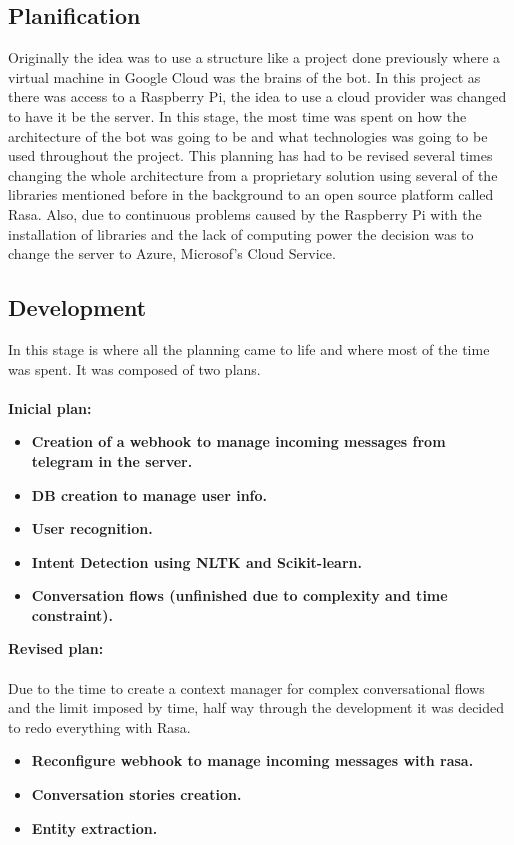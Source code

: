 \subsection{Planification}\label{sec:chap1_plan}
Originally the idea was to use a structure like a project done previously where a virtual machine in Google Cloud was the brains of the bot. In this project as there was access to a Raspberry Pi, the idea to use a cloud provider was changed to have it be the server. 
In this stage, the most time was spent on how the architecture of the bot was going to be and what technologies was going to be used throughout the project. This planning has had to be revised several times changing the whole architecture from a proprietary solution using several of the libraries mentioned before in the background to an open source platform called Rasa. Also, due to continuous problems caused by the Raspberry Pi with the installation of libraries and the lack of computing power the decision was to change the server to Azure, Microsof’s Cloud Service.
\subsection{Development}\label{sec:chap1_dev}
In this stage is where all the planning came to life and where most of the time was spent. It was composed of two plans. \\\\
\textbf{Inicial plan:}
\begin{itemize}
	\item{\textbf{Creation of a webhook to manage incoming messages from telegram in the server.}}
	\item{\textbf{DB creation to manage user info.}}
	\item{\textbf{User recognition.}}
	\item{\textbf{Intent Detection using NLTK and Scikit-learn.}}
	\item{\textbf{Conversation flows (unfinished due to complexity and time constraint).}}
\end{itemize}
\textbf{Revised plan:} \\\\
	Due to the time to create a context manager for complex conversational flows and the limit imposed by time, half way through the development it was decided to redo everything with Rasa.
\begin{itemize}
	\item{\textbf{Reconfigure webhook to manage incoming messages with rasa.}}
	\item{\textbf{Conversation stories creation.}}
	\item{\textbf{Entity extraction.}}
\end{itemize}

